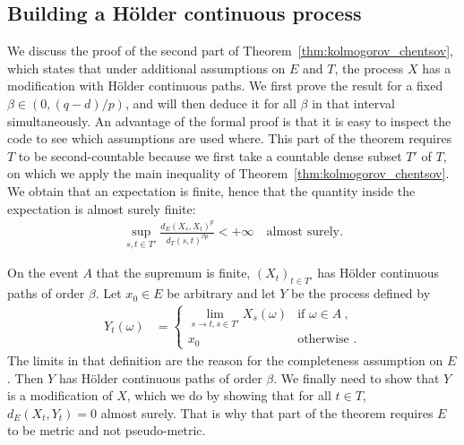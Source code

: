 \documentclass[lean]{Draft}
\begin{document}



\subsection{Building a Hölder continuous process}
\label{sub:holder_process}

We discuss the proof of the second part of Theorem~\ref{thm:kolmogorov_chentsov}, which states that under additional assumptions on $E$ and $T$, the process $X$ has a modification with Hölder continuous paths.
We first prove the result for a fixed $\beta \in (0, (q - d)/p)$, and will then deduce it for all $\beta$ in that interval simultaneously.
An advantage of the formal proof is that it is easy to inspect the code to see which assumptions are used where.
This part of the theorem requires $T$ to be second-countable because we first take a countable dense subset $T'$ of $T$, on which we apply the main inequality of Theorem~\ref{thm:kolmogorov_chentsov}.
We obtain that an expectation is finite, hence that the quantity inside the expectation is almost surely finite:
\begin{align*}
  \sup_{s, t \in T'} \frac{d_E(X_s, X_t)^p}{d_T(s, t)^{\beta p}} < +\infty
  \quad \text{almost surely.}
\end{align*}

On the event $A$ that the supremum is finite, $(X_t)_{t \in T'}$ has Hölder continuous paths of order $\beta$.
Let $x_0 \in E$ be arbitrary and let $Y$ be the process defined by
\begin{align*}
  Y_t(\omega)
  &= \begin{cases}
    \lim_{s \to t, s \in T'} X_s(\omega) & \text{if } \omega \in A \: , \\
    x_0 & \text{otherwise .}
  \end{cases}
\end{align*}
The limits in that definition are the reason for the completeness assumption on $E$.
Then $Y$ has Hölder continuous paths of order $\beta$.
We finally need to show that $Y$ is a modification of $X$, which we do by showing that for all $t \in T$, $d_E(X_t, Y_t) = 0$ almost surely.
That is why that part of the theorem requires $E$ to be metric and not pseudo-metric.
\end{document}
